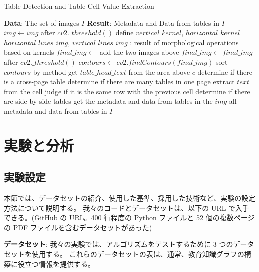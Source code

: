 \documentclass[uplatex, twocolumn,10pt]{jsarticle}
\begin{document}
%
%
%
%
%
%

\begin{algorithm}
    \caption{Table Detection and Table Cell Value Extraction}
    \begin{algorithmic}
    \STATE \textbf{Data}: The set of images $I$
    \STATE \textbf{Result}: Metadata and Data from tables in $I$
        \STATE $img \leftarrow img$ after $cv2.\_threshold()$
        \STATE define $vertical\_kernel$, $horizontal\_kernel$
        \STATE $horizontal\_lines\_img$, $vertical\_lines\_img$ : result of
        \STATE \quad morphological operations based on kernels
        \STATE $final\_img \leftarrow$ add the two images above
        \STATE $final\_img \leftarrow final\_img$ after $cv2.\_threshold()$
        \STATE $contours \leftarrow cv2.findContours(final\_img)$
        \STATE sort $contours$ by method
                \STATE get $table\_head\_text$ from the area above $c$
                \STATE determine if there is a cross-page table
                \STATE determine if there are many tables in one page
                \STATE extract $text$ from the cell
                \STATE judge if it is the same row with the previous cell
                \STATE determine if there are side-by-side tables
            \ENDIF
            \STATE get the metadata and data from tables in the $img$
        \ENDFOR
        \STATE all metadata and data from tables in $I$
    \ENDFOR
    \end{algorithmic}
\end{algorithm}


\section{実験と分析}

\subsection{実験設定}
本節では、データセットの紹介、使用した基準、採用した技術など、実験の設定方法について説明する。
我々のコードとデータセットは、以下の URL で入手できる。(GitHub の URL。400 行程度の Python ファイルと 52 個の複数ページの PDF ファイルを含むデータセットがあった)

\textbf{データセット}:
我々の実験では、アルゴリズムをテストするために 3 つのデータセットを使用する。
これらのデータセットの表は、通常、教育知識グラフの構築に役立つ情報を提供する。
\end{document}
